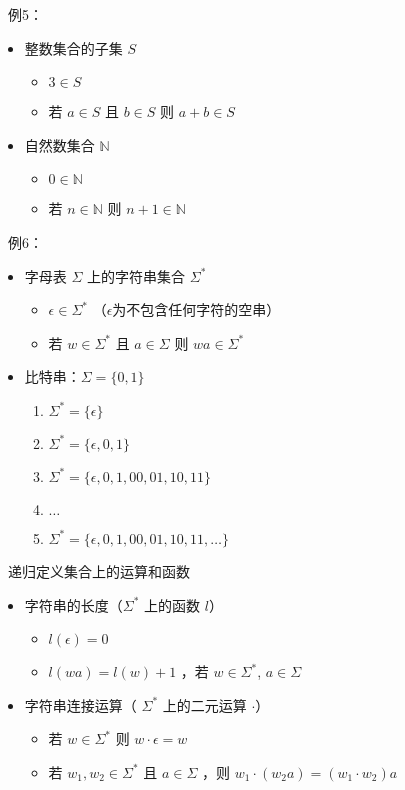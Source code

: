 \documentclass[UTF8]{report}
\theoremstyle{MyLineTheoremStyle} %
\theoremstyle{MyBlockTheoremStyle} %
\theoremstyle{MySubsubsectionStyle} %
\begin{document}
\textbullet\ 例5：
\begin{itemize}
    \item 整数集合的子集 $S$
    \begin{itemize}
        \item $3 \in S$
        \item 若 $a \in S$ 且 $b \in S$ 则 $a + b \in S$
    \end{itemize}
    \item 自然数集合 $\mathbb{N}$
    \begin{itemize}
        \item $0 \in \mathbb{N}$
        \item 若 $n \in \mathbb{N}$ 则 $n + 1 \in \mathbb{N}$
    \end{itemize}
\end{itemize}

\textbullet\ 例6：
\begin{itemize}
    \item 字母表 $\Sigma$ 上的字符串集合 $\Sigma^*$
    \begin{itemize}
        \item $\epsilon \in \Sigma^*$ （$\epsilon$为不包含任何字符的空串）
        \item 若 $w \in \Sigma^*$ 且 $a \in \Sigma$ 则 $wa \in \Sigma^*$
    \end{itemize}
    \item 比特串：$\Sigma = \{0,1\}$
    \begin{enumerate}
        \item $\Sigma^* = \{\epsilon\}$
        \item $\Sigma^* = \{\epsilon, 0, 1\}$
        \item $\Sigma^* = \{\epsilon, 0, 1, 00, 01, 10, 11\}$
        \item $\ldots$
        \item $\Sigma^* = \{\epsilon, 0, 1, 00, 01, 10, 11, \ldots\}$
    \end{enumerate}
\end{itemize}

\textbullet\ 递归定义集合上的运算和函数
\begin{itemize}
    \item 字符串的长度（$\Sigma^*$ 上的函数 $l$）
    \begin{itemize}
        \item $l(\epsilon) = 0$
        \item $l(wa) = l(w) + 1$ ，若 $w \in \Sigma^*$, $a \in \Sigma$
    \end{itemize}
    \item 字符串连接运算（ $\Sigma^*$ 上的二元运算 $\cdot$）
    \begin{itemize}
        \item 若 $w \in \Sigma^*$ 则 $w \cdot \epsilon = w$
        \item 若 $w_1, w_2 \in \Sigma^*$ 且 $a \in \Sigma$ ，则 $w_1 \cdot (w_2a) = (w_1 \cdot w_2)a$
    \end{itemize}
\end{itemize}
\end{document}
